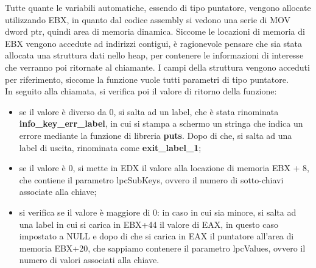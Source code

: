 \documentclass[12pt]{extarticle}
\begin{document}
Tutte quante le variabili automatiche, essendo di tipo puntatore, vengono allocate utilizzando EBX, in quanto dal codice assembly si vedono una serie di \textsf{MOV dword ptr}, quindi area di memoria dinamica. Siccome le locazioni di memoria di EBX vengono accedute ad indirizzi contigui, è ragionevole pensare che sia stata allocata una struttura dati nello heap, per contenere le informazioni di interesse che verranno poi ritornate al chiamante. I campi della struttura vengono acceduti per riferimento, siccome la funzione vuole tutti parametri di tipo puntatore.\\
In seguito alla chiamata, si verifica poi il valore di ritorno della funzione:
\begin{itemize}
\item se il valore è diverso da 0, si salta ad un label, che è stata rinominata \textbf{info\_key\_err\_label}, in cui si stampa a schermo un stringa che indica un errore mediante la funzione di libreria \textbf{puts}. Dopo di che, si salta ad una label di uscita, rinominata come \textbf{exit\_label\_1};
\item se il valore è 0, si mette in EDX il valore alla locazione di memoria EBX + 8, che contiene il parametro \textsf{lpcSubKeys}, ovvero il numero di sotto-chiavi associate alla chiave;
\item si verifica se il valore è maggiore di 0:  in caso in cui sia minore, si salta ad una label in cui si carica in EBX+44 il valore di EAX, in questo caso impostato a NULL e dopo di che si carica in EAX il puntatore all'area di memoria EBX+20, che sappiamo contenere il parametro \textsf{lpcValues}, ovvero il numero di valori associati alla chiave.
\end{itemize}
\end{document}
